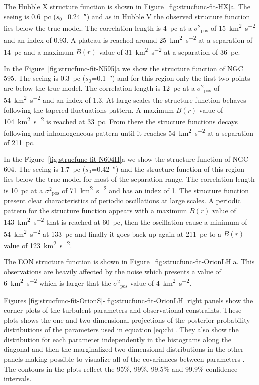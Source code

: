 \documentclass[fleqn,usenatbib, useAMS, a4paper]{mnras}
\newcommand\pos{\ensuremath{_{\mathrm{pos}}}}
\begin{document}
The Hubble X structure function is shown in Figure~\ref{fig:strucfunc-fit-HX}a.
The seeing is \SI{0.6}{pc} (\(s_0\)=\SI{0.24}{\arcsecond}) and as in Hubble V the observed structure function lies below the true model.
The correlation length is \SI{4}{pc} at a \(\sigma^2\pos\) of \SI{15}{km^{2}.s^{-2}} and an index of \num{0.93}.
A plateau is reached around \SI{25}{km^{2}.s^{-2}} at a separation of \SI{14}{pc} and a maximum \(B(r)\) value of \SI{31}{km^{2}.s^{-2}} at a separation of \SI{36}{pc}.

In the Figure~\ref{fig:strucfunc-fit-N595}a we show the structure function of NGC 595.
The seeing is \SI{0.3}{pc} (\(s_0\)=\SI{0.1}{\arcsecond}) and for this region only the first two points are below the true model. 
The correlation length is \SI{12}{pc} at a \(\sigma^2\pos\) of \SI{54}{km^{2}.s^{-2}} and an index of \num{1.3}.
At large scales the structure function behaves following the tapered fluctuations pattern.
A maximum \(B(r)\) value of \SI{104}{km^{2}.s^{-2}} is reached at \SI{33}{pc}. 
From there the structure functions decays following and inhomogeneous pattern until it reaches \SI{54}{km^{2}.s^{-2}} at a separation of \SI{211}{pc}.  

In the Figure~\ref{fig:strucfunc-fit-N604H}a we show the structure function of NGC 604.
The seeing is \SI{1.7}{pc} (\(s_0\)=\SI{0.42}{\arcsecond}) and the structure function of this region lies below the true model for most of the separation range.
The correlation length is \SI{10}{pc} at a \(\sigma^2\pos\) of \SI{71}{km^{2}.s^{-2}} and has an index of \num{1}.
The structure function present clear characteristics of periodic oscillations at large scales.
A periodic pattern for the structure function appears with a maximum \(B(r)\) value of \SI{143}{km^{2}.s^{-2}} that is reached at \SI{60}{pc}, then the oscillation cause a minimum of \SI{54}{km^{2}.s^{-2}} at \SI{133}{pc} and finally it goes back up again at \SI{211}{pc} to a \(B(r)\) value of \SI{123}{km^{2}.s^{-2}}.

The EON structure function is shown in Figure~\ref{fig:strucfunc-fit-OrionLH}a.
This observations are heavily affected by the noise which presents a value of \SI{6}{km^{2}.s^{-2}} which is larger that the \(\sigma^2\pos\) value of \SI{4}{km^{2}.s^{-2}}. 

Figures \ref{fig:strucfunc-fit-OrionS}-\ref{fig:strucfunc-fit-OrionLH} right panels show the corner plots \citep{2017ascl.soft02002F} of the turbulent parameters and observational constraints. 
These plots shows the one and two dimensional projections of the posterior probability distributions of the parameters used in equation \ref{eq:chi}.
They also show the distribution for each parameter independently in the histograms along the diagonal and then the marginalized two dimensional distributions in the other panels making possible to visualize all of the covariances between parameters \citep{2017ascl.soft02002F}.
The contours in the plots reflect the 95\(\%\), 99\(\%\), 99.5\(\%\) and 99.9\(\%\) confidence intervals.
\end{document}
